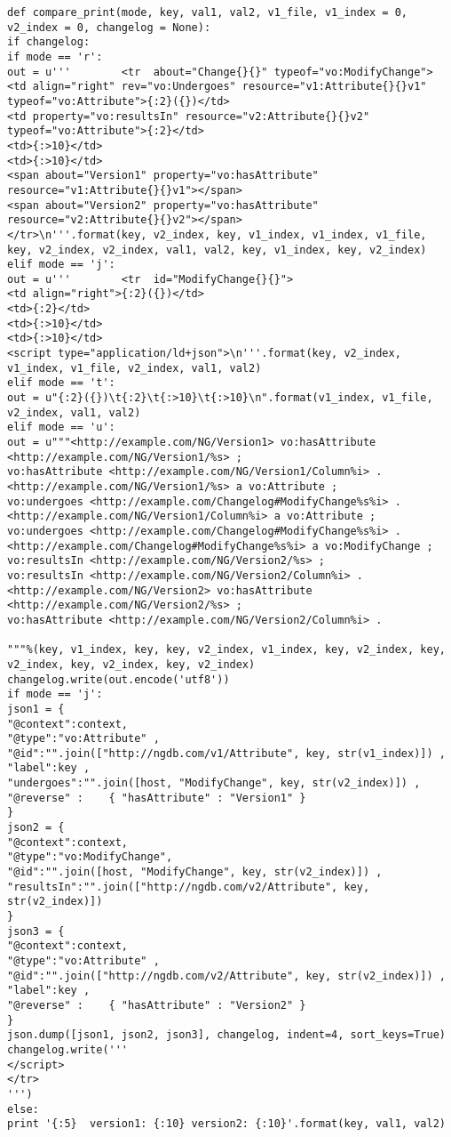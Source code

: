 \begin{verbatim}
def compare_print(mode, key, val1, val2, v1_file, v1_index = 0, v2_index = 0, changelog = None):
if changelog:
if mode == 'r':
out = u'''        <tr  about="Change{}{}" typeof="vo:ModifyChange">
<td align="right" rev="vo:Undergoes" resource="v1:Attribute{}{}v1" typeof="vo:Attribute">{:2}({})</td>
<td property="vo:resultsIn" resource="v2:Attribute{}{}v2" typeof="vo:Attribute">{:2}</td>
<td>{:>10}</td>
<td>{:>10}</td>
<span about="Version1" property="vo:hasAttribute" resource="v1:Attribute{}{}v1"></span>
<span about="Version2" property="vo:hasAttribute" resource="v2:Attribute{}{}v2"></span>
</tr>\n'''.format(key, v2_index, key, v1_index, v1_index, v1_file, key, v2_index, v2_index, val1, val2, key, v1_index, key, v2_index)
elif mode == 'j':
out = u'''        <tr  id="ModifyChange{}{}">
<td align="right">{:2}({})</td>
<td>{:2}</td>
<td>{:>10}</td>
<td>{:>10}</td>
<script type="application/ld+json">\n'''.format(key, v2_index, v1_index, v1_file, v2_index, val1, val2)
elif mode == 't':
out = u"{:2}({})\t{:2}\t{:>10}\t{:>10}\n".format(v1_index, v1_file, v2_index, val1, val2)
elif mode == 'u':
out = u"""<http://example.com/NG/Version1> vo:hasAttribute <http://example.com/NG/Version1/%s> ;
vo:hasAttribute <http://example.com/NG/Version1/Column%i> .
<http://example.com/NG/Version1/%s> a vo:Attribute ;
vo:undergoes <http://example.com/Changelog#ModifyChange%s%i> .
<http://example.com/NG/Version1/Column%i> a vo:Attribute ;
vo:undergoes <http://example.com/Changelog#ModifyChange%s%i> .
<http://example.com/Changelog#ModifyChange%s%i> a vo:ModifyChange ;
vo:resultsIn <http://example.com/NG/Version2/%s> ;
vo:resultsIn <http://example.com/NG/Version2/Column%i> .
<http://example.com/NG/Version2> vo:hasAttribute <http://example.com/NG/Version2/%s> ;
vo:hasAttribute <http://example.com/NG/Version2/Column%i> .

"""%(key, v1_index, key, key, v2_index, v1_index, key, v2_index, key, v2_index, key, v2_index, key, v2_index)
changelog.write(out.encode('utf8'))
if mode == 'j':
json1 = {
"@context":context,
"@type":"vo:Attribute" ,
"@id":"".join(["http://ngdb.com/v1/Attribute", key, str(v1_index)]) ,
"label":key ,
"undergoes":"".join([host, "ModifyChange", key, str(v2_index)]) ,
"@reverse" :    { "hasAttribute" : "Version1" }
}
json2 = {
"@context":context,
"@type":"vo:ModifyChange",
"@id":"".join([host, "ModifyChange", key, str(v2_index)]) ,
"resultsIn":"".join(["http://ngdb.com/v2/Attribute", key, str(v2_index)])
}
json3 = {
"@context":context,
"@type":"vo:Attribute" ,
"@id":"".join(["http://ngdb.com/v2/Attribute", key, str(v2_index)]) ,
"label":key ,
"@reverse" :    { "hasAttribute" : "Version2" }
}
json.dump([json1, json2, json3], changelog, indent=4, sort_keys=True)
changelog.write('''
</script>
</tr>
''')
else:
print '{:5}  version1: {:10} version2: {:10}'.format(key, val1, val2)


\end{verbatim}

